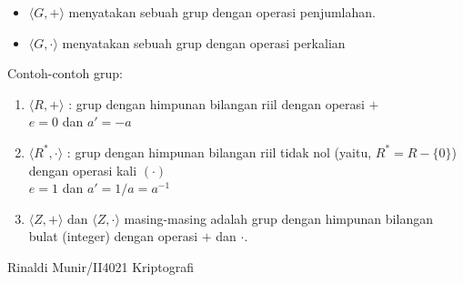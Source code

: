 \documentclass{article}
\begin{document}

\begin{itemize}
  \item $\langle G, + \rangle$ menyatakan sebuah grup dengan operasi penjumlahan.
  \item $\langle G, \cdot \rangle$ menyatakan sebuah grup dengan operasi perkalian
\end{itemize}

Contoh-contoh grup:

\begin{enumerate}
  \item $\langle R, + \rangle$ : grup dengan himpunan bilangan riil dengan operasi $+$ \\
  $e = 0$ dan $a' = -a$
  
  \item $\langle R^*, \cdot \rangle$ : grup dengan himpunan bilangan riil tidak nol (yaitu, $R^* = R - \{ 0 \}$) dengan operasi kali $(\cdot)$ \\
  $e = 1$ dan $a' = 1/a = a^{-1}$
  
  \item $\langle Z, + \rangle$ dan $\langle Z, \cdot \rangle$ masing-masing adalah grup dengan himpunan bilangan bulat (integer) dengan operasi $+$ dan $\cdot$.
\end{enumerate}

\vfill
\begin{center}
  Rinaldi Munir/II4021 Kriptografi
\end{center}
\end{document}
